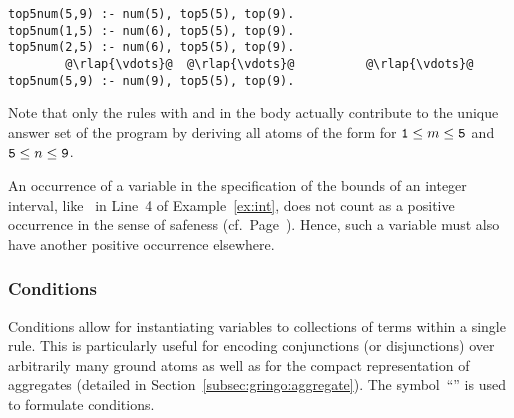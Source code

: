 \begin{example}
\begin{lstlisting}[numbers=none,escapechar=@]
top5num(5,9) :- num(5), top5(5), top(9).
top5num(1,5) :- num(6), top5(5), top(9).
top5num(2,5) :- num(6), top5(5), top(9).
        @\rlap{\vdots}@  @\rlap{\vdots}@          @\rlap{\vdots}@
top5num(5,9) :- num(9), top5(5), top(9).
\end{lstlisting}
%
Note that only the rules with
 and
%
%
in the body actually contribute to the unique answer set
of the program by deriving all atoms 
of the form 
for $\texttt{1}\leq m\leq\texttt{5}$ and $\texttt{5}\leq n\leq\texttt{9}$.
\eexample
\end{example}

\begin{Note}
An occurrence of a variable in the specification of the bounds
of an integer interval, like~ in Line~4 of Example~\ref{ex:int}, 
does not count as a positive occurrence
in the sense of safeness (cf.\ Page~\pageref{pg:safe}).
Hence, such a variable must also have another positive occurrence elsewhere.
%
\end{Note}

\subsubsection{Conditions}\label{subsec:gringo:condition}

Conditions allow for instantiating variables to
collections of terms within a single rule.
This is particularly useful for encoding conjunctions (or disjunctions) over
arbitrarily many ground atoms as well as for the compact representation of aggregates
(detailed in Section~\ref{subsec:gringo:aggregate}).
The symbol~``\code{:}'' is used to formulate conditions.


